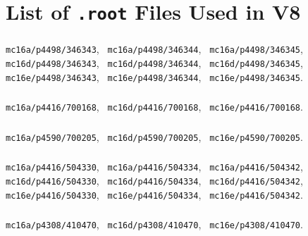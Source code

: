 \section{List of \texttt{.root} Files Used in V8}
\label{appendix:dsids}

\subsubsection{\tth}
\texttt{mc16a/p4498/346343}, \texttt{ mc16a/p4498/346344}, \texttt{ mc16a/p4498/346345},
\newline \texttt{ mc16d/p4498/346343}, \texttt{ mc16d/p4498/346344}, \texttt{ mc16d/p4498/346345},
\newline \texttt{ mc16e/p4498/346343}, \texttt{ mc16e/p4498/346344}, \texttt{ mc16e/p4498/346345}.

\subsubsection{\ttw}
\texttt{mc16a/p4416/700168}, \texttt{ mc16d/p4416/700168}, \texttt{ mc16e/p4416/700168}.

\subsubsection{\ttwew}
\texttt{mc16a/p4590/700205}, \texttt{ mc16d/p4590/700205}, \texttt{ mc16e/p4590/700205}.

\subsubsection{\ttz}
\texttt{mc16a/p4416/504330}, \texttt{ mc16a/p4416/504334}, \texttt{ mc16a/p4416/504342},
\newline \texttt{ mc16d/p4416/504330}, \texttt{ mc16d/p4416/504334}, \texttt{ mc16d/p4416/504342},
\newline \texttt{ mc16e/p4416/504330}, \texttt{ mc16e/p4416/504334}, \texttt{ mc16e/p4416/504342}.

\subsubsection{\ttbar}
\texttt{mc16a/p4308/410470}, \texttt{ mc16d/p4308/410470}, \texttt{ mc16e/p4308/410470}.

